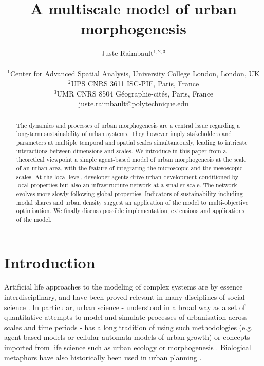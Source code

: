 \documentclass[letterpaper]{article}
\title{A multiscale model of urban morphogenesis}
\author{Juste Raimbault$^{1,2,3}$\\
\mbox{}\\
$^1$Center for Advanced Spatial Analysis, University College London, London, UK\\
$^2$UPS CNRS 3611 ISC-PIF, Paris, France\\
$^3$UMR CNRS 8504 G{\'e}ographie-cit{\'e}s, Paris, France\\
juste.raimbault@polytechnique.edu} %
\begin{document}
\maketitle

\begin{abstract}
The dynamics and processes of urban morphogenesis are a central issue regarding a long-term sustainability of urban systems. They however imply stakeholders and parameters at multiple temporal and spatial scales simultaneously, leading to intricate interactions between dimensions and scales. We introduce in this paper from a theoretical viewpoint a simple agent-based model of urban morphogenesis at the scale of an urban area, with the feature of integrating the microscopic and the mesoscopic scales. At the local level, developer agents drive urban development conditioned by local properties but also an infrastructure network at a smaller scale. The network evolves more slowly following global properties. Indicators of sustainability including modal shares and urban density suggest an application of the model to multi-objective optimisation. We finally discuss possible implementation, extensions and applications of the model.
\end{abstract}

\section{Introduction}

Artificial life approaches to the modeling of complex systems are by essence interdisciplinary, and have been proved relevant in many disciplines of social science \citep{youn2018scaling}. In particular, urban science - understood in a broad way as a set of quantitative attempts to model and simulate processes of urbanisation across scales and time periods \citep{batty2013new} - has a long tradition of using such methodologies (e.g. agent-based models or cellular automata models of urban growth) or concepts imported from life science such as urban ecology or morphogenesis \citep{raimbault2020cities}. Biological metaphors have also historically been used in urban planning \citep{batty2009centenary}.
\end{document}
